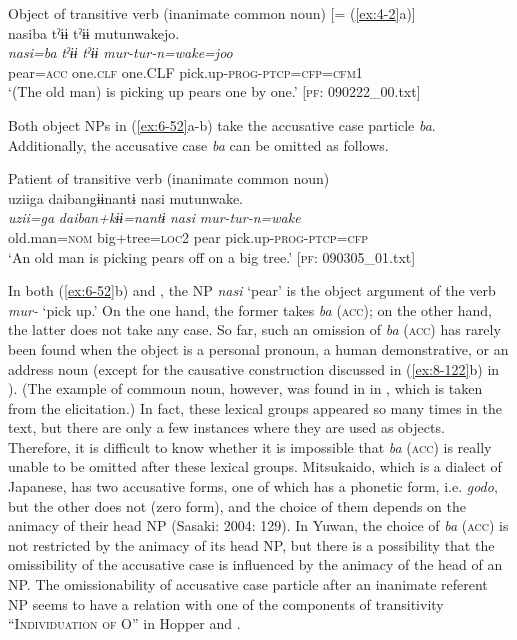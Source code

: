 \ex Object of transitive verb (inanimate common noun) [= (\ref{ex:4-2}a)]\\
{\TM}
\glll  nasiba  tˀɨɨ  tˀɨɨ  mutunwakejo.\\
\textit{nasi=ba}  \textit{tˀɨɨ}  \textit{tˀɨɨ}  \textit{mur-tur-n=wake=joo}\\
pear=\textsc{acc}  one.\textsc{clf}  one.CLF  pick.up-\textsc{prog}-\textsc{ptcp}=\textsc{cfp}=\textsc{cfm}1\\
\glt ‘(The old man) is picking up pears one by one.’ [\textsc{pf}: 090222\_00.txt]
\z
\z

Both object NPs in (\ref{ex:6-52}a-b) take the accusative case particle \textit{ba}. Additionally, the accusative case \textit{ba} can be omitted as follows.

\ea\label{ex:6-53}
 Patient of transitive verb (inanimate common noun)\\

{\TM}
\glll uziiga  daibangɨɨnantɨ  nasi  mutunwake.\\
\textit{uzii=ga}  \textit{daiban+kɨɨ=nantɨ}  \textit{nasi}  \textit{mur-tur-n=wake}\\
    old.man=\textsc{nom}  big+tree=\textsc{loc2}  pear  pick.up-\textsc{prog}-\textsc{ptcp}=\textsc{cfp}\\
\glt    ‘An old man is picking pears off on a big tree.’ [\textsc{pf}: 090305\_01.txt]
\z

In both (\ref{ex:6-52}b) and , the NP \textit{nasi} ‘pear’ is the object argument of the verb \textit{mur-} ‘pick up.’ On the one hand, the former takes \textit{ba} (\textsc{acc}); on the other hand, the latter does not take any case. So far, such an omission of \textit{ba} (\textsc{acc}) has rarely been found when the object is a personal pronoun, a human demonstrative, or an address noun (except for the causative construction discussed in (\ref{ex:8-122}b) in ). (The example of commoun noun, however, was found in  in , which is taken from the elicitation.) In fact, these lexical groups appeared so many times in the text, but there are only a few instances where they are used as objects. Therefore, it is difficult to know whether it is impossible that \textit{ba} (\textsc{acc}) is really unable to be omitted after these lexical groups. Mitsukaido, which is a dialect of Japanese, has two accusative forms, one of which has a phonetic form, i.e. \textit{godo}, but the other does not (zero form), and the choice of them depends on the animacy of their head NP (Sasaki: 2004: 129). In Yuwan, the choice of \textit{ba} (\textsc{acc}) is not restricted by the animacy of its head NP, but there is a possibility that the omissibility of the accusative case is influenced by the animacy of the head of an NP. The omissionability of accusative case particle after an inanimate referent NP seems to have a relation with one of the components of transitivity “I\textsc{ndividuation} \textsc{of} O” in Hopper and \citet[252]{Thompson1980}.

